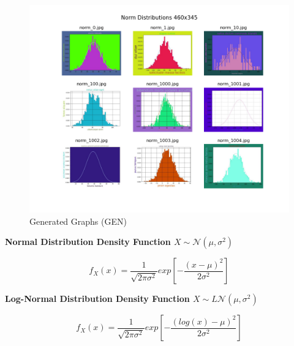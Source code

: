 \documentclass[12pt]{article}
\begin{document}
            \begin{figure}[ht]
            
                \begin{center}

                    \includegraphics[scale=0.6]{norm_460x345_overview.png}
                    \caption{Generated Graphs (GEN)}
                    \label{generated-overview}
        
                \end{center}
                
            \end{figure}

            \textbf{Normal Distribution Density Function  $ X \sim \mathcal{N}(\mu, \sigma^2)  $}
               
            \begin{Large} 

                \[ f_X(x) = \frac{1}{\sqrt{2\pi \sigma^2}} exp\left[{-\frac{(x - \mu)^2}{2 \sigma^2}}\right] \] 

            \end{Large}

            \textbf{Log-Normal Distribution Density Function  $ X \sim L\mathcal{N}(\mu, \sigma^2) $}

            \begin{Large} 

                \[ f_X(x) = \frac{1}{\sqrt{2\pi \sigma^2}} exp\left[{-\frac{(log(x) - \mu)^2}{2 \sigma^2}}\right] \] 

            \end{Large}
\end{document}

